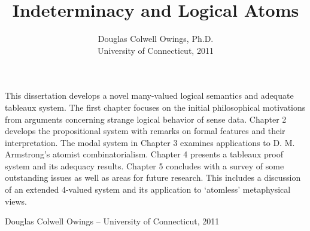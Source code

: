 \documentclass[12pt,leqno]{article}
\title{\normalsize{Indeterminacy and Logical Atoms}}
\author{\normalsize{Douglas Colwell Owings, Ph.D.} \\ \normalsize{University of Connecticut, 2011}}
\date{}
\begin{document}
	
\doublespace
\maketitle
\thispagestyle{empty}

This dissertation develops a novel many-valued logical semantics and adequate tableaux system. The first chapter focuses on the initial philosophical motivations from arguments concerning strange logical behavior of sense data. Chapter 2 develops the propositional system with remarks on formal features and their interpretation. The modal system in Chapter 3 examines applications to D. M. Armstrong's atomist combinatorialism. Chapter 4 presents a tableaux proof system and its adequacy results. Chapter 5 concludes with a survey of some outstanding issues as well as areas for future research. This includes a discussion of an extended $4$-valued system and its application to `atomless' metaphysical views.

\begin{center}
Douglas Colwell Owings -- University of Connecticut, 2011
\end{center}
\end{document}
